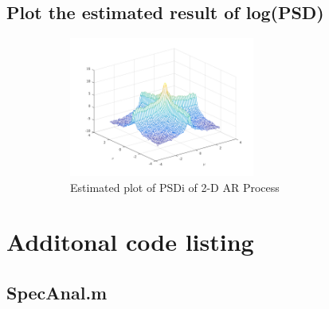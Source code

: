 \documentclass{article}
\begin{document}
\subsection{Plot the estimated result of log(PSD)}
	\begin{description}
	\item[]
		\begin{figure}[h]
			\begin{center}
				\includegraphics[width=0.6\textwidth]{psd_esti.png}
				\caption{Estimated plot of PSDi of 2-D AR Process}
			\end{center}
		\end{figure}
	\end{description}

\section{Additonal code listing}
	\subsection{SpecAnal.m}
		\inputminted[tabsize=4,breaklines]{matlab}{SpecAnal.m}
\end{document}
